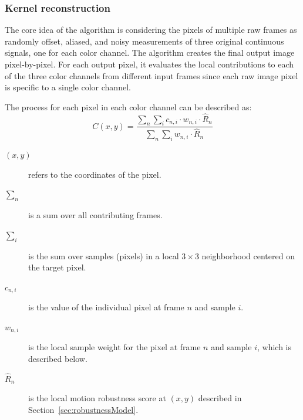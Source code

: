 \documentclass{sig-alternate}
\begin{document}
\subsubsection{Kernel reconstruction}
\label{sec:kernelReconstruction}

The core idea of the algorithm is considering the pixels of multiple raw frames as randomly offset, aliased, and noisy measurements of three original continuous signals, one for each color channel. The algorithm creates the final output image pixel-by-pixel. For each output pixel, it evaluates the local contributions to each of the three color channels from different input frames since each raw image pixel is specific to a single color channel. 

The process for each pixel in each color channel can be described as:
\begin{equation*}
C(x, y)=\frac{\sum_{n} \sum_{i} c_{n, i} \cdot w_{n, i} \cdot \hat{R}_{n}}{\sum_{n} \sum_{i} w_{n, i} \cdot \hat{R}_{n}}
\end{equation*}


\begin{description}
  \item[$(x,y)$] refers to the coordinates of the pixel. 
  \item[$\sum_{n}$] is a sum over all contributing frames.
  \item[$\sum_{i}$] is the sum over samples (pixels) in a local $3\times 3$ neighborhood centered on the target pixel.
  \item[$c_{n, i}$] is the value of the individual pixel at frame $n$ and sample $i$.
  \item[$w_{n, i}$] is the local sample weight for the pixel at frame $n$ and sample $i$, which is described below. 
  \item[$\hat{R}_{n}$] is the local motion robustness score at $(x,y)$ described in Section~\ref{sec:robustnessModel}.
\end{description}


\end{document}
